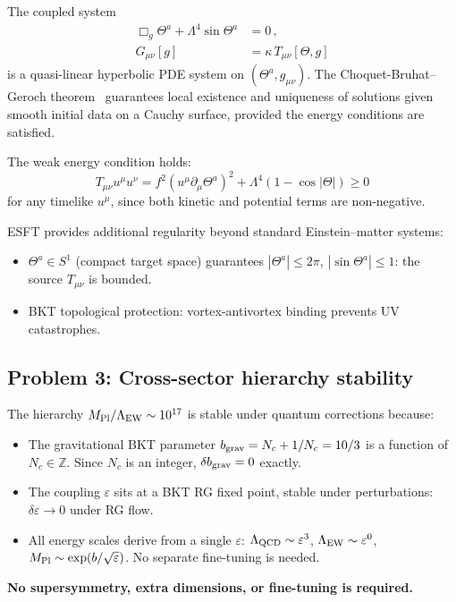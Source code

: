 \documentclass[twocolumn,preprintnumbers,amsmath,amssymb,prd]{revtex4-2}
\begin{document}
The coupled system
\begin{align}
\Box_g\Theta^a + \Lambda^4\sin\Theta^a &= 0\,, \\
G_{\mu\nu}[g] &= \kappa\,T_{\mu\nu}[\Theta,g]
\end{align}
is a quasi-linear hyperbolic PDE system on $(\Theta^a, g_{\mu\nu})$.
The Choquet-Bruhat--Geroch theorem~\cite{ChoquetBruhat1969} guarantees local existence and uniqueness of solutions given smooth initial data on a Cauchy surface, provided the energy conditions are satisfied.

The weak energy condition holds:
\begin{equation}
T_{\mu\nu}u^\mu u^\nu = f^2(u^\mu\partial_\mu\Theta^a)^2 + \Lambda^4(1-\cos|\Theta|) \geq 0
\end{equation}
for any timelike $u^\mu$, since both kinetic and potential terms are non-negative.

ESFT provides additional regularity beyond standard Einstein--matter systems:
\begin{itemize}
\item $\Theta^a \in S^1$ (compact target space) guarantees $|\Theta^a| \leq 2\pi$, $|\sin\Theta^a| \leq 1$: the source $T_{\mu\nu}$ is bounded.
\item BKT topological protection: vortex-antivortex binding prevents UV catastrophes.
\end{itemize}

\subsection{Problem 3: Cross-sector hierarchy stability}

The hierarchy $M_{\rm Pl}/\Lambda_{\rm EW} \sim 10^{17}$ is stable under quantum corrections because:
\begin{itemize}
\item The gravitational BKT parameter $b_{\rm grav} = N_c + 1/N_c = 10/3$ is a function of $N_c \in \mathbb{Z}$. Since $N_c$ is an integer, $\delta b_{\rm grav} = 0$ exactly.
\item The coupling $\varepsilon$ sits at a BKT RG fixed point, stable under perturbations: $\delta\varepsilon \to 0$ under RG flow.
\item All energy scales derive from a single $\varepsilon$: $\Lambda_{\rm QCD} \sim \varepsilon^3$, $\Lambda_{\rm EW} \sim \varepsilon^0$, $M_{\rm Pl} \sim \exp(b/\sqrt{\varepsilon})$. No separate fine-tuning is needed.
\end{itemize}
\textbf{No supersymmetry, extra dimensions, or fine-tuning is required.}
\end{document}
